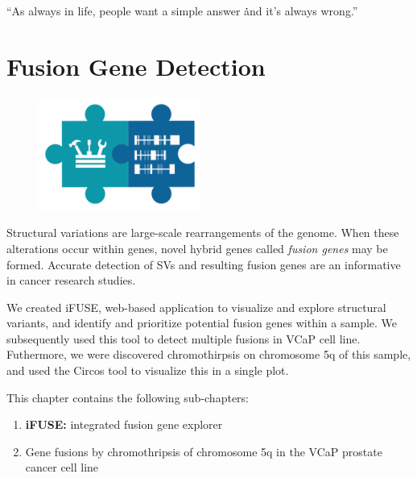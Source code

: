 \cleartorightpage
\begin{savequote}[75mm]
“As always in life, people want a simple answer \. \. \. and it’s always wrong.”
\end{savequote}

\chapter{Fusion Gene Detection}\label{chapter:fusiongenes}
\setcounter{figure}{-1}
\setcounter{table}{-1}
\setcounter{section}{-1}

\begin{figure}[t!]
\includegraphics[height=10em]{frontmatter/images/chapter-header-fusion-tools.png}
\end{figure}
\setcounter{figure}{-1}
\setcounter{table}{-1}
\setcounter{section}{-1}


Structural variations are large-scale rearrangements of the genome. When these alterations occur within genes, novel hybrid genes called \emph{fusion genes} may be formed. Accurate detection of SVs and resulting fusion genes are an informative in cancer research studies.

We created iFUSE, web-based application to visualize and explore structural variants, and identify and prioritize potential fusion genes within a sample. We subsequently used this tool to detect multiple fusions in VCaP cell line. Futhermore, we were discovered chromothirpsis on chromosome 5q of this sample, and used the Circos tool to visualize this in a single plot.

This chapter contains the following sub-chapters:

\begin{enumerate}[label=\ref{chapter:fusiongenes}.\arabic*]
\itemsep-0.5em
\setcounter{enumi}{-1}
\item \textbf{iFUSE:} integrated fusion gene explorer
\item Gene fusions by chromothripsis of chromosome 5q in the VCaP prostate cancer cell line
\end{enumerate}

